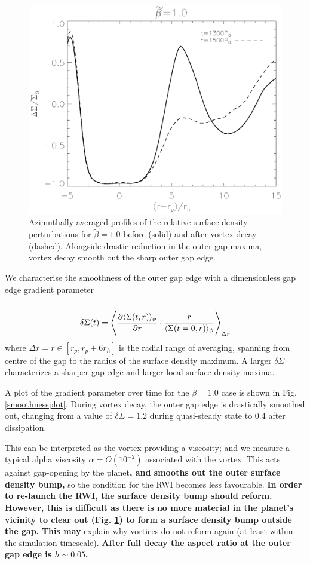 \begin{figure}
  \includegraphics[width=\linewidth]{figures/gapchange}
  \caption{Azimuthally averaged profiles of the relative surface
    density perturbations for  $\tilde\beta=1.0$
    before (solid) and after vortex decay
    (dashed). Alongside drastic reduction in the outer gap maxima, vortex decay
    smooth out the sharp outer gap edge.
    \label{gap_smoothed}} 
\end{figure}

We characterise the smoothness of the outer gap edge with a dimensionless
gap edge gradient parameter
\begin{align}
  \delta\Sigma(t)= \la \frac{\partial \langle \Sigma(t,r)
    \rangle_{\phi}}{\partial r} \cdot \frac{r}{\langle \Sigma(t=0,r)
    \rangle_{\phi}} \ra_{\Delta r}  
\end{align}
where $\Delta r = r\in [r_p,r_p + 6r_h]$ is the radial range of averaging, spanning
from centre of the gap to the radius of the surface density maximum.
A larger $\delta \Sigma$ characterizes a sharper gap edge and  
larger local surface density maxima.   

A plot of the gradient parameter over time
for the $\tilde\beta=1.0$ case is shown in Fig. \ref{smoothnessplot}.
During vortex decay, the outer gap edge is 
drastically smoothed out, changing from a value of $\delta\Sigma=1.2$ during
quasi-steady state to $0.4$ after dissipation. 

This can be interpreted as the vortex providing a viscosity;  
and we measure a typical alpha viscosity $\alpha = O(10^{-2})$
associated with the vortex. This acts against gap-opening
by the planet{\bf, and smooths out the outer surface density bump,    
} so the condition for the RWI 
becomes less favourable. {\bf In
  order to re-launch the RWI, the surface density bump should
  reform. However, this is difficult as there is no more material
  in the planet's vicinity to clear out (Fig. \ref{gap_smoothed}) to
  form a surface density bump outside the gap.} {\bf This may} explain
why vortices do  not reform again (at least within the simulation timescale). 
{\bf After full decay the aspect ratio at the outer gap edge is
  $h\sim0.05$. }

